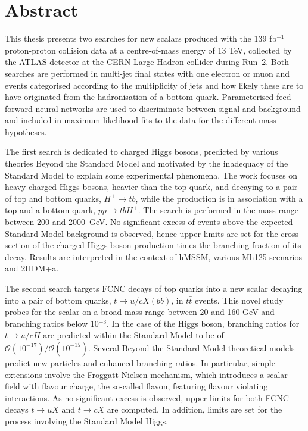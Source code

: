 \chapter*{Abstract}


This thesis presents two searches for new scalars produced with the 139 fb$^{-1}$ proton-proton collision data at a centre-of-mass energy of 13 TeV, collected by the ATLAS detector at the CERN Large Hadron collider during Run~2.
Both searches are performed in multi-jet final states with one electron or muon and events categorised according to the multiplicity of jets and how likely these are to have originated from the hadronisation of a bottom quark. Parameterised feed-forward neural networks are used to discriminate between signal and background and included in maximum-likelihood fits to the data for the different mass hypotheses.

The first search is dedicated to charged Higgs bosons, predicted by various theories Beyond the Standard Model and motivated by the inadequacy of the Standard Model to explain some experimental phenomena. The work focuses on heavy charged Higgs bosons, heavier than the top quark, and decaying to a pair of top and bottom quarks, $H^\pm\to tb$, while the production is in association with a top and a bottom quark, $pp\to tbH^\pm$.
The search is performed in the mass range between 200 and 2000~GeV. No significant excess of events above the expected Standard Model background is observed, hence upper limits are set for the cross-section of the charged Higgs boson production times the branching fraction of its decay. Results are interpreted in the context of hMSSM, various Mh125 scenarios and 2HDM+a.

The second search targets FCNC decays of top quarks into a new scalar decaying into a pair of bottom quarks, $t \to u/c X(bb)$, in $t\bar{t}$ events. This novel study probes for the scalar on a broad mass range between 20 and 160 GeV and branching ratios below 10$^{-3}$. In the case of the Higgs boson, branching ratios for $t \to u/c H$ are predicted within the Standard Model to be of $\mathcal{O}(10^{-17})/\mathcal{O}(10^{-15})$. Several Beyond the Standard Model theoretical models predict new particles and enhanced branching ratios. In particular, simple extensions involve the Froggatt-Nielsen mechanism, which introduces a scalar field with flavour charge, the so-called flavon, featuring flavour violating interactions. As no significant excess is observed, upper limits for both FCNC decays $t\to uX$ and $t\to cX$ are computed. In addition, limits are set for the process involving the Standard Model Higgs.